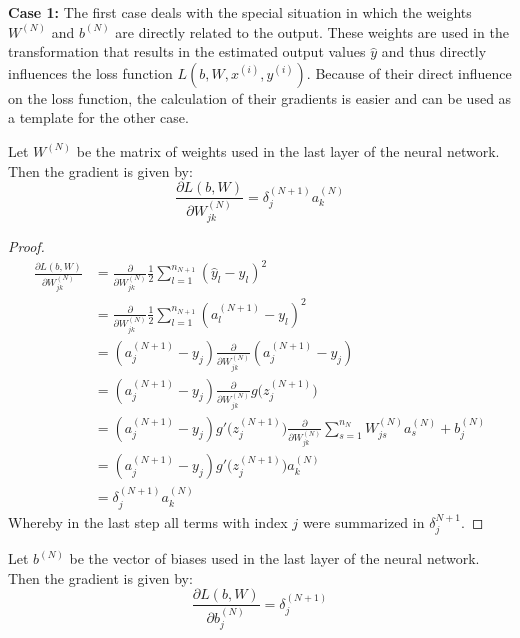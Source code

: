 \textbf{Case 1:} The first case deals with the special situation in which the weights $W^{(N)}$ and $b^{(N)}$ are directly related to the output. These weights are used in the transformation that results in the estimated output values $\hat{y}$ and thus directly influences the loss function $L(b, W, x^{(i)}, y^{(i)})$. Because of their direct influence on the loss function, the calculation of their gradients is easier and can be used as a template for the other case.

\begin{remark}
	Let $W^{(N)}$ be the matrix of weights used in the last layer of the neural network. Then the gradient is given by: 
	\begin{equation*}
		\frac{\partial L(b,W)}{\partial W_{jk}^{(N)}} = \delta_j^{(N+1)} a_k^{(N)} 
	\end{equation*}
	
	\begin{proof}
	\begin{align*} %
		\frac{\partial L(b,W)}{\partial W_{jk}^{(N)}} 
		&= \frac{\partial}{\partial W_{jk}^{(N)}} \frac{1}{2} \sum_{l = 1}^{n_{N+1}} (\hat{y}_l - y_l)^2 \\
		&= \frac{\partial}{\partial W_{jk}^{(N)}} \frac{1}{2} \sum_{l = 1}^{n_{N+1}} (a_l^{(N+1)} - y_l)^2  \\
		&= (a_j^{(N+1)} - y_j)  \frac{\partial}{\partial W_{jk}^{(N)}} (a_j^{(N+1)} - y_j) \\
		&= (a_j^{(N+1)} - y_j)  \frac{\partial}{\partial W_{jk}^{(N)}} g\big(z_j^{(N+1)} \big)  \\
		&= (a_j^{(N+1)} - y_j)  g'\big(z_j^{(N+1)} \big) \frac{\partial}{\partial W_{jk}^{(N)}} \sum_{s=1}^{n_N} W_{js}^{(N)} a_s^{(N)} + b_j^{(N)} \\
		&= (a_j^{(N+1)} - y_j)  g'\big(z_j^{(N+1)} \big) a_k^{(N)} \\
		&=	\delta_j^{(N+1)} a_k^{(N)} 
	\end{align*}
	Whereby in the last step all terms with index $j$ were summarized in $\delta_j^{N+1}$.
	\end{proof}
\end{remark}

\begin{remark}
	Let $b^{(N)}$ be the vector of biases used in the last layer of the neural network. Then the gradient is given by: 
	\begin{equation*}
		\frac{\partial L(b,W)}{\partial b_{j}^{(N)}} = \delta_j^{(N+1)}
	\end{equation*}
\end{remark}

